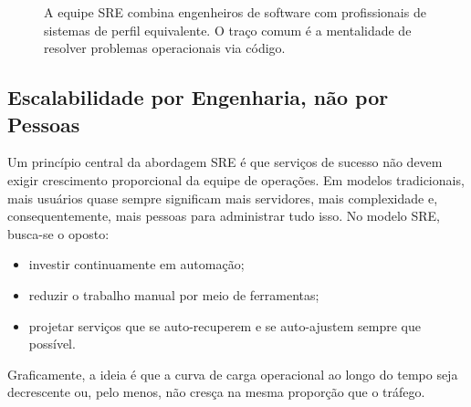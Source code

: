 \documentclass[12pt,a4paper,twoside]{report}
\begin{document}
\begin{figure}[h]
    \centering
    \caption{A equipe SRE combina engenheiros de software com profissionais de sistemas de perfil equivalente. O traço comum é a mentalidade de resolver problemas operacionais via código.}
\end{figure}

\subsection{Escalabilidade por Engenharia, não por Pessoas}

Um princípio central da abordagem SRE é que serviços de sucesso não devem
exigir crescimento proporcional da equipe de operações. Em modelos
tradicionais, mais usuários quase sempre significam mais servidores, mais
complexidade e, consequentemente, mais pessoas para administrar tudo isso. No modelo SRE, busca-se o oposto:
\begin{itemize}[nosep]
    \item investir continuamente em automação;
    \item reduzir o trabalho manual por meio de ferramentas;
    \item projetar serviços que se auto-recuperem e se auto-ajustem sempre que
    possível.
\end{itemize}

Graficamente, a ideia é que a curva de carga operacional ao longo do tempo
seja decrescente ou, pelo menos, não cresça na mesma proporção que o
tráfego.
\end{document}
